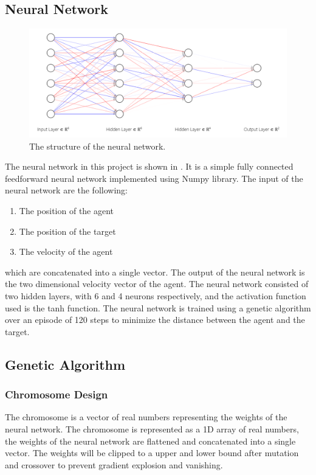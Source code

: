 \documentclass[sigconf]{acmart}
\begin{document}
\subsection{Neural Network}
\begin{figure}[H]
  \centering
  \includegraphics[width=0.95\linewidth]{NeuralNetwork.png}
  \caption{The structure of the neural network.}
  \label{fig:neural_network}
\end{figure}
The neural network in this project is shown in . It is a simple fully connected feedforward neural network implemented using Numpy library. The input of the neural network are the following:
\begin{enumerate}
  \item The position of the agent
  \item The position of the target
  \item The velocity of the agent
\end{enumerate}
which are concatenated into a single vector.
The output of the neural network is the two dimensional velocity vector of the agent. The neural network consisted of two hidden layers, with 6 and 4 neurons respectively, and the activation function used is the tanh function. The neural network is trained using a genetic algorithm over an episode of 120 steps to minimize the distance between the agent and the target.

\subsection{Genetic Algorithm}
\subsubsection{Chromosome Design} The chromosome is a vector of real numbers representing the weights of the neural network. The chromosome is represented as a 1D array of real numbers, the weights of the neural network are flattened and concatenated into a single vector. The weights will be clipped to a upper and lower bound after mutation and crossover to prevent gradient explosion and vanishing.
\end{document}
